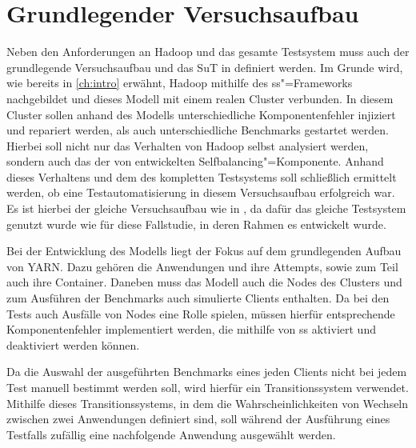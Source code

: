 \section{Grundlegender Versuchsaufbau}
\label{sec:clusterSetup}

Neben den Anforderungen an Hadoop und das gesamte Testsystem muss auch der grundlegende Versuchsaufbau und das \ac{SuT} in definiert werden.
Im Grunde wird, wie bereits in \autoref{ch:intro} erwähnt, Hadoop mithilfe des \ac{ss}"=Frameworks nachgebildet und dieses Modell mit einem realen Cluster verbunden.
In diesem Cluster sollen anhand des Modells unterschiedliche Komponentenfehler injiziert und repariert werden, als auch unterschiedliche Benchmarks gestartet werden.
Hierbei soll nicht nur das Verhalten von Hadoop selbst analysiert werden, sondern auch das der von \citeauthor{zhang2016} entwickelten Selfbalancing"=Komponente.
Anhand dieses Verhaltens und dem des kompletten Testsystems soll schließlich ermittelt werden, ob eine Testautomatisierung in diesem Versuchsaufbau erfolgreich war.
Es ist hierbei der gleiche Versuchsaufbau wie in \cite{Eberhardinger2018}, da dafür das gleiche Testsystem genutzt wurde wie für diese Fallstudie, in deren Rahmen es entwickelt wurde.

Bei der Entwicklung des Modells liegt der Fokus auf dem grundlegenden Aufbau von \ac{YARN}.
Dazu gehören die Anwendungen und ihre Attempts, sowie zum Teil auch ihre Container.
Daneben muss das Modell auch die Nodes des Clusters und zum Ausführen der Benchmarks auch simulierte Clients enthalten.
Da bei den Tests auch Ausfälle von Nodes eine Rolle spielen, müssen hierfür entsprechende Komponentenfehler implementiert werden, die mithilfe von \ac{ss} aktiviert und deaktiviert werden können.

Da die Auswahl der ausgeführten Benchmarks eines jeden Clients nicht bei jedem Test manuell bestimmt werden soll, wird hierfür ein Transitionssystem verwendet.
Mithilfe dieses Transitionssystems, in dem die Wahrscheinlichkeiten von Wechseln zwischen zwei Anwendungen definiert sind, soll während der Ausführung eines Testfalls zufällig eine nachfolgende Anwendung ausgewählt werden.

